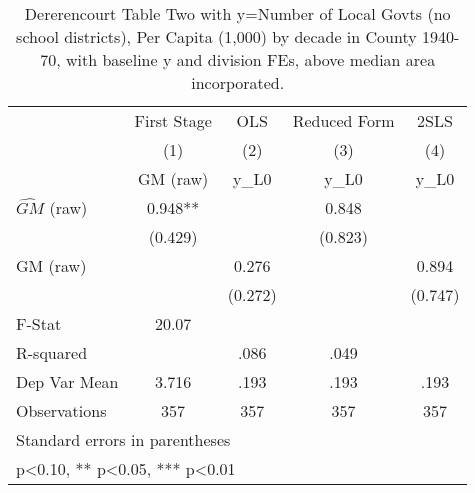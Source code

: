 \begin{table}[htbp]\centering
\def\sym#1{\ifmmode^{#1}\else\(^{#1}\)\fi}
\caption{Dererencourt Table Two with y=Number of Local Govts (no school districts), Per Capita (1,000) by decade in County 1940-70, with baseline y and division FEs, above median area incorporated.}
\begin{tabular}{l*{4}{c}}
\toprule
                    & First Stage   &         OLS   &Reduced Form   &        2SLS   \\
                    &\multicolumn{1}{c}{(1)}&\multicolumn{1}{c}{(2)}&\multicolumn{1}{c}{(3)}&\multicolumn{1}{c}{(4)}\\
                    &\multicolumn{1}{c}{GM  (raw)}&\multicolumn{1}{c}{y\_L0}&\multicolumn{1}{c}{y\_L0}&\multicolumn{1}{c}{y\_L0}\\
\midrule
$\hat{GM}$ (raw)    &       0.948** &               &       0.848   &               \\
                    &     (0.429)   &               &     (0.823)   &               \\
\addlinespace
GM  (raw)           &               &       0.276   &               &       0.894   \\
                    &               &     (0.272)   &               &     (0.747)   \\
\midrule
F-Stat              &       20.07   &               &               &               \\
R-squared           &               &        .086   &        .049   &               \\
Dep Var Mean        &       3.716   &        .193   &        .193   &        .193   \\
Observations        &         357   &         357   &         357   &         357   \\
\bottomrule
\multicolumn{5}{l}{\footnotesize Standard errors in parentheses}\\
\multicolumn{5}{l}{\footnotesize * p<0.10, ** p<0.05, *** p<0.01}\\
\end{tabular}
\end{table}

